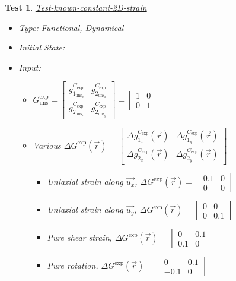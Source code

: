 \documentclass[12pt, titlepage]{article}
\newtheorem{Test}{Test}
\begin{document}
\begin{Test}\normalfont\underline{Test-known-constant-2D-strain}
\label{T_known-constant-2D-strain}
\begin{itemize}
\item Type: Functional, Dynamical
\item Initial State:
\item Input:
\begin{itemize}
	\item $G_{\text{uns}}^{\text{exp}} =
	\begin{bmatrix}
	g_{1_{{\text{uns}}_x}}^{C_{\text{exp}}} & g_{2_{{\text{uns}}_x}}^{C_{\text{exp}}} \\
	g_{2_{{\text{uns}}_x}}^{C_{\text{exp}}} & g_{2_{{\text{uns}}_y}}^{C_{\text{exp}}} 
	\end{bmatrix} =\begin{bmatrix}
	1 & 0 \\
	0 & 1 
	\end{bmatrix}$
	\item Various $\Delta G^{\text{exp}}(\vec{r}) =
	\begin{bmatrix}
	\Delta g_{1_{x}}^{C_{\text{exp}}}(\vec{r}) & \Delta g_{1_{y}}^{C_{\text{exp}}}(\vec{r}) \\
	\Delta g_{2_{x}}^{C_{\text{exp}}}(\vec{r}) & \Delta g_{2_{y}}^{C_{\text{exp}}}(\vec{r})
	\end{bmatrix}$
		\begin{itemize}
		\item Uniaxial strain along $\vec{u_x}$, $\Delta G^{\text{exp}}(\vec{r}) = \begin{bmatrix}
	0.1 & 0 \\
	0 & 0 
	\end{bmatrix} $
		\item Uniaxial strain along $\vec{u_y}$, $\Delta G^{\text{exp}}(\vec{r}) = \begin{bmatrix}
	0 & 0 \\
	0 & 0.1 
	\end{bmatrix} $
		\item Pure shear strain, $\Delta G^{\text{exp}}(\vec{r}) = \begin{bmatrix}
	0 & 0.1 \\
	0.1 & 0 
	\end{bmatrix} $
		\item Pure rotation, $\Delta G^{\text{exp}}(\vec{r}) = \begin{bmatrix}
	0 & 0.1 \\
	-0.1 & 0 
	\end{bmatrix} $
		\end{itemize}	
	

\end{itemize}
\end{itemize}
\end{Test}
\end{document}
